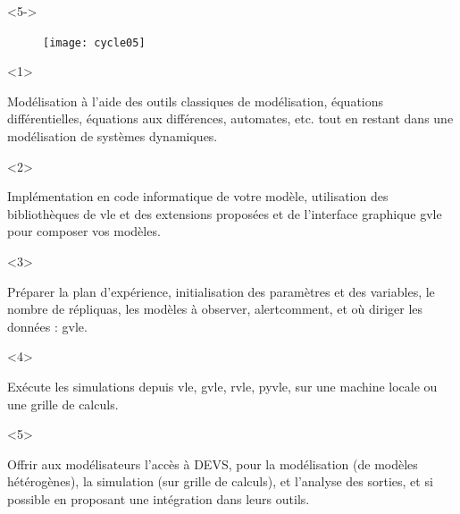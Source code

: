 \documentclass[xetex, compress, table, dvipsnames]{beamer}
\begin{document}
\begin{frame}
\begin{center}
    \begin{onlyenv}<5->
      \begin{figure}[htpb]
        \begin{center}
          \texttt{[image: cycle05]}
        \end{center}
      \end{figure}
    \end{onlyenv}
  \end{center}
  \begin{onlyenv}<1>
    \begin{exampleblock}{}
      \alert{Modélisation} à l'aide des outils
      \alert{classiques} de modélisation, équations
      différentielles, équations aux différences, automates, etc. tout
      en restant dans une modélisation de systèmes dynamiques.
    \end{exampleblock}
  \end{onlyenv}
  \begin{onlyenv}<2>
    \begin{exampleblock}{}
      \alert{Implémentation} en code informatique de votre modèle,
      utilisation des \alert{bibliothèques} de \alert{vle} et
      des \alert{extensions proposées} et de l'interface graphique
      \alert{gvle} pour composer vos modèles.
    \end{exampleblock}
  \end{onlyenv}
  \begin{onlyenv}<3>
    \begin{exampleblock}{}
      \alert{Préparer} la plan d'expérience,
      \alert{initialisation} des paramètres et des variables, le
      nombre de \alert{répliquas}, les modèles à
      \alert{observer}, alert{comment}, et \alert{où} diriger
      les données : \alert{gvle}.
    \end{exampleblock}
  \end{onlyenv}
  \begin{onlyenv}<4>
    \begin{exampleblock}{}
      \alert{Exécute} les simulations depuis \alert{vle},
      \alert{gvle}, \alert{rvle}, \alert{pyvle}, sur une
      machine locale ou une grille de calculs.
    \end{exampleblock}
  \end{onlyenv}
  \begin{onlyenv}<5>
    \begin{exampleblock}{}
      Offrir aux modélisateurs l'accès à DEVS, pour la
      \alert{modélisation} (de modèles hétérogènes), la
      \alert{simulation} (sur grille de calculs), et
      l'\alert{analyse} des sorties, et si possible en proposant
      une \alert{intégration} dans leurs outils.
    \end{exampleblock}
  \end{onlyenv}
\end{frame}
\end{document}
